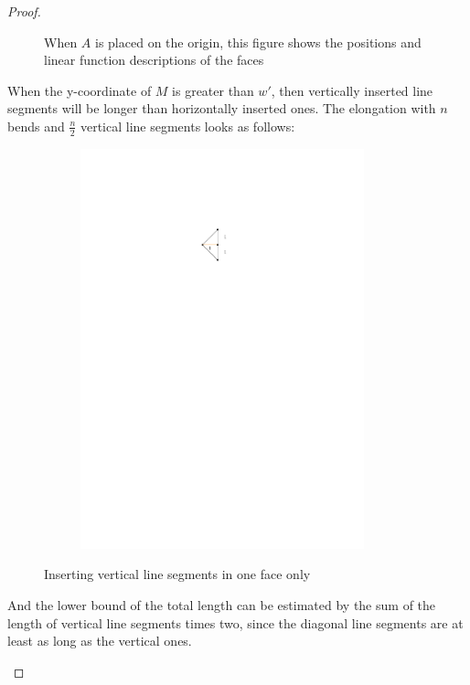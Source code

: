 \begin{proof}
\begin{itemize}
\begin{figure}[H]
\begin{subfigure}{0.8\linewidth}
			\end{subfigure}
			\caption{When $A$ is placed on the origin, this figure shows the positions and linear function descriptions of the faces}\label{im:coordinate_properties}
		\end{figure}
	
		When the y-coordinate of $M$ is greater than $w'$, then vertically inserted line segments will be longer than horizontally inserted ones. The elongation with $n$ bends and $\frac{n}{2}$ vertical line segments looks as follows:
		\begin{figure}[H]
			\centering
			\begin{subfigure}{0.6\linewidth}
				\centering
				\includegraphics[width=0.9\textwidth,page=8]{drawings/maximal_planar.pdf}
			\end{subfigure}
			\caption{Inserting vertical line segments in one face only}\label{im:vertical_one_face}
		\end{figure}
		And the lower bound of the total length can be estimated by the sum of the length of vertical line segments times two, since the diagonal line segments are at least as long as the vertical ones.

\end{itemize}
\end{proof}
